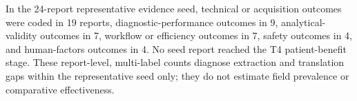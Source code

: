 In the 24-report representative evidence seed, technical or acquisition outcomes were coded in 19 reports, diagnostic-performance outcomes in 9, analytical-validity outcomes in 7, workflow or efficiency outcomes in 7, safety outcomes in 4, and human-factors outcomes in 4. No seed report reached the T4 patient-benefit stage. These report-level, multi-label counts diagnose extraction and translation gaps within the representative seed only; they do not estimate field prevalence or comparative effectiveness.
